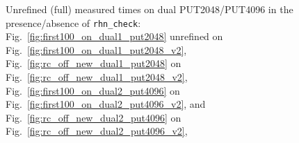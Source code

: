 \documentclass[10pt]{article}
\begin{document}
\begin{figure}[H]
{		\label{fig:rc_off_new_dual1_put2048}
	}
	\caption{Unrefined (full) measured times on dual PUT2048/PUT4096 in the presence/absence of {\tt rhn\_check}: Fig.~\ref{fig:first100_on_dual1_put2048} unrefined on Fig.~\ref{fig:first100_on_dual1_put2048_v2}, 
Fig.~\ref{fig:rc_off_new_dual1_put2048} on Fig.~\ref{fig:rc_off_new_dual1_put2048_v2}, 
Fig.~\ref{fig:first100_on_dual2_put4096} on Fig.~\ref{fig:first100_on_dual2_put4096_v2}, and  
Fig.~\ref{fig:rc_off_new_dual2_put4096} on Fig.~\ref{fig:rc_off_new_dual2_put4096_v2}, 	
	~\label{fig:rhn_check_effect3}}
\end{figure}
\end{document}
